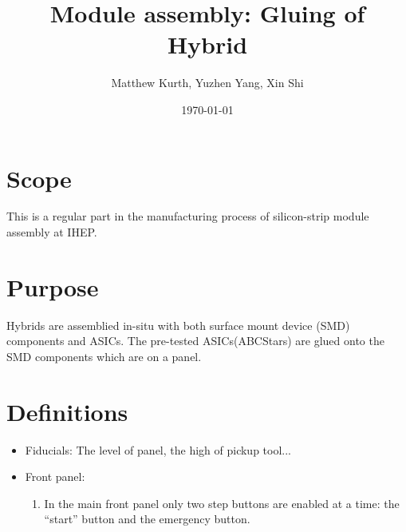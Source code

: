 \documentclass[12pt]{cnihepsop}
\title{Module assembly: Gluing of Hybrid}
\date{\today}
\author{Matthew Kurth, Yuzhen Yang, Xin Shi}
\begin{document}
\maketitle

\section{Scope}
This is a regular part in the manufacturing process of silicon-strip module assembly at IHEP.

\section{Purpose}
Hybrids are assemblied in-situ with both surface mount device (SMD) components and ASICs. The pre-tested ASICs(ABCStars) are glued onto the SMD components which are on a panel. 

\section{Definitions}
\begin{itemize}
\item Fiducials: The level of panel, the high of pickup tool...
\item Front panel: 
  \begin{enumerate}
    \item In the main front panel only two step buttons are enabled at a time: the ``start'' button and the emergency button. 
  \end{enumerate}
\end{itemize}



\end{document}
